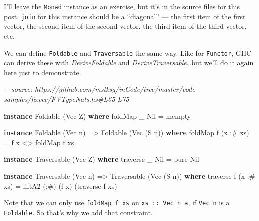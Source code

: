 \documentclass[]{article}
\newenvironment{Shaded}{}{}
\newcommand{\CommentTok}[1]{\textcolor[rgb]{0.38,0.63,0.69}{\textit{#1}}}
\newcommand{\DataTypeTok}[1]{\textcolor[rgb]{0.56,0.13,0.00}{#1}}
\newcommand{\FunctionTok}[1]{\textcolor[rgb]{0.02,0.16,0.49}{#1}}
\newcommand{\KeywordTok}[1]{\textcolor[rgb]{0.00,0.44,0.13}{\textbf{#1}}}
\newcommand{\NormalTok}[1]{#1}
\newcommand{\OperatorTok}[1]{\textcolor[rgb]{0.40,0.40,0.40}{#1}}
\newcommand{\OtherTok}[1]{\textcolor[rgb]{0.00,0.44,0.13}{#1}}
\begin{document}
I'll leave the \texttt{Monad} instance as an exercise, but it's in the source
files for this post. \texttt{join} for this instance should be a ``diagonal''
--- the first item of the first vector, the second item of the second vector,
the third item of the third vector, etc.

We can define \texttt{Foldable} and \texttt{Traversable} the same way. Like for
\texttt{Functor}, GHC can derive these with \emph{DeriveFoldable} and
\emph{DeriveTraversable}\ldots but we'll do it again here just to demonstrate.

\begin{Shaded}
\begin{Highlighting}[]
\CommentTok{{-}{-} source: https://github.com/mstksg/inCode/tree/master/code{-}samples/fixvec/FVTypeNats.hs\#L65{-}L75}

\KeywordTok{instance} \DataTypeTok{Foldable}\NormalTok{ (}\DataTypeTok{Vec} \DataTypeTok{Z}\NormalTok{) }\KeywordTok{where}
    \FunctionTok{foldMap}\NormalTok{ \_ }\DataTypeTok{Nil} \OtherTok{=} \FunctionTok{mempty}

\KeywordTok{instance} \DataTypeTok{Foldable}\NormalTok{ (}\DataTypeTok{Vec}\NormalTok{ n) }\OtherTok{=\textgreater{}} \DataTypeTok{Foldable}\NormalTok{ (}\DataTypeTok{Vec}\NormalTok{ (}\DataTypeTok{S}\NormalTok{ n)) }\KeywordTok{where}
    \FunctionTok{foldMap}\NormalTok{ f (x }\OperatorTok{:\#}\NormalTok{ xs) }\OtherTok{=}\NormalTok{ f x }\OperatorTok{\textless{}\textgreater{}} \FunctionTok{foldMap}\NormalTok{ f xs}

\KeywordTok{instance} \DataTypeTok{Traversable}\NormalTok{ (}\DataTypeTok{Vec} \DataTypeTok{Z}\NormalTok{) }\KeywordTok{where}
    \FunctionTok{traverse}\NormalTok{ \_ }\DataTypeTok{Nil} \OtherTok{=} \FunctionTok{pure} \DataTypeTok{Nil}

\KeywordTok{instance} \DataTypeTok{Traversable}\NormalTok{ (}\DataTypeTok{Vec}\NormalTok{ n) }\OtherTok{=\textgreater{}} \DataTypeTok{Traversable}\NormalTok{ (}\DataTypeTok{Vec}\NormalTok{ (}\DataTypeTok{S}\NormalTok{ n)) }\KeywordTok{where}
    \FunctionTok{traverse}\NormalTok{ f (x }\OperatorTok{:\#}\NormalTok{ xs) }\OtherTok{=}\NormalTok{ liftA2 (}\OperatorTok{:\#}\NormalTok{) (f x) (}\FunctionTok{traverse}\NormalTok{ f xs)}
\end{Highlighting}
\end{Shaded}

Note that we can only use \texttt{foldMap\ f\ xs} on \texttt{xs\ ::\ Vec\ n\ a},
if \texttt{Vec\ n} is a \texttt{Foldable}. So that's why we add that constraint.
\end{document}
